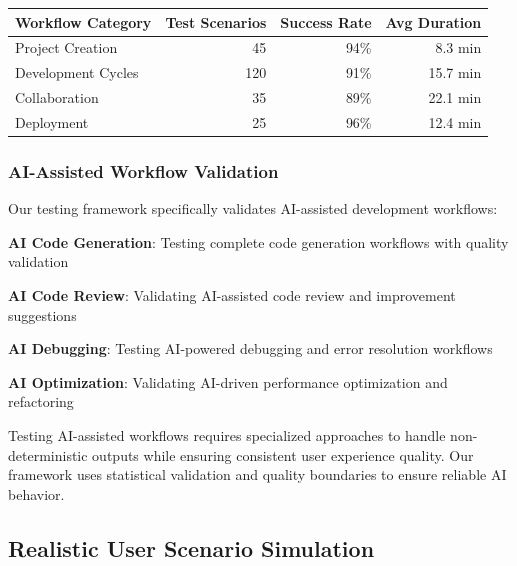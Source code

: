 \begin{center}
\begin{tabular}{@{}lrrr@{}}
\toprule
\textbf{Workflow Category} & \textbf{Test Scenarios} & \textbf{Success Rate} & \textbf{Avg Duration} \\
\midrule
Project Creation & 45 & 94\% & 8.3 min \\
Development Cycles & 120 & 91\% & 15.7 min \\
Collaboration & 35 & 89\% & 22.1 min \\
Deployment & 25 & 96\% & 12.4 min \\
\bottomrule
\end{tabular}
\end{center}

\subsubsection*{AI-Assisted Workflow Validation}

Our testing framework specifically validates AI-assisted development workflows:

\begin{compactlist}
    \item \textbf{AI Code Generation}: Testing complete code generation workflows with quality validation
    \item \textbf{AI Code Review}: Validating AI-assisted code review and improvement suggestions
    \item \textbf{AI Debugging}: Testing AI-powered debugging and error resolution workflows
    \item \textbf{AI Optimization}: Validating AI-driven performance optimization and refactoring
\end{compactlist}

\begin{infobox}[title=AI Workflow Testing Challenges]
Testing AI-assisted workflows requires specialized approaches to handle non-deterministic outputs while ensuring consistent user experience quality. Our framework uses statistical validation and quality boundaries to ensure reliable AI behavior.
\end{infobox}

\subsection*{Realistic User Scenario Simulation}

